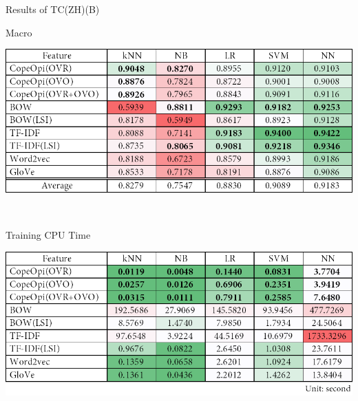 \begin{table}[H]
\caption{Results of TC(ZH)(B)}
\label{tab:tc_zh_b}
\centering
\begin{subtable}{\textwidth}
	\centering
	\caption{Macro \fscore{}}
	\includegraphics[width=\resultfigwidth]{chapters/ch4/table/tc/TC(ZH)(B).png}
\end{subtable}
\\[\tblskip]
\begin{subtable}{\textwidth}
	\centering
	\caption{Training CPU Time}
	\includegraphics[width=\resultfigwidth]{chapters/ch4/table/tc/TC(ZH)(B)T.png}
\end{subtable}
\end{table}